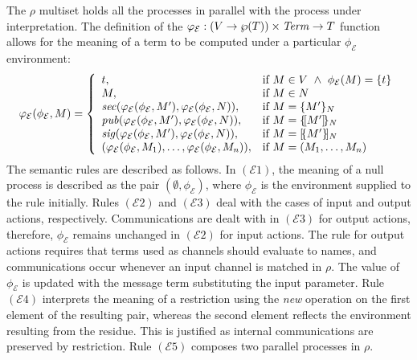 \documentclass{entcs} \usepackage{entcsmacro}
\begin{document}
The $\rho$ multiset holds all the processes in parallel with the process under interpretation.  The definition of the $\varphi_\mathcal{E}:( V\to\wp(T))\times\mbox{{\itshape Term\/}}\to T$ function allows for the meaning of a term to be computed under a particular $\phi_\mathcal{E}$ environment:
\[\varphi_\mathcal{E}(\phi_\mathcal{E},M)=\left\{\begin{array}{ll}t,&\mbox{if }M\in V~\wedge~\phi_\mathcal{E}(M)=\{t\}\\
M,&\mbox{if }M\in N\\
\mbox{{\itshape sec\/}}(\varphi_\mathcal{E}(\phi_\mathcal{E},M'),\varphi_\mathcal{E}(\phi_\mathcal{E},N)),&\mbox{if }M=\{M'\}_{N}\\
\mbox{{\itshape pub\/}}(\varphi_\mathcal{E}(\phi_\mathcal{E},M'),\varphi_\mathcal{E}(\phi_\mathcal{E},N)),&\mbox{if }M=\{\![M']\!\}_{N}\\
\mbox{{\itshape sig\/}}(\varphi_\mathcal{E}(\phi_\mathcal{E},M'),\varphi_\mathcal{E}(\phi_\mathcal{E},N)),&\mbox{if }M=[\!\{M'\}\!]_{N}\\
(\varphi_\mathcal{E}(\phi_\mathcal{E},M_1),\ldots,\varphi_\mathcal{E}(\phi_\mathcal{E},M_n)),&\mbox{if }M=(M_1,\ldots,M_n)\\
\end{array}\right.\]
The semantic rules are described as follows.  In $(\mathcal{E}1)$, the meaning of a null process is described as the pair $(\emptyset,\phi_\mathcal{E})$, where $\phi_\mathcal{E}$ is the environment supplied to the rule initially.  Rules $(\mathcal{E}2)$ and $(\mathcal{E}3)$ deal with the cases of input and output actions, respectively. Communications are dealt with in $(\mathcal{E}3)$ for output actions, therefore, $\phi_\mathcal{E}$ remains unchanged in $(\mathcal{E}2)$ for input actions.  The rule for output actions requires that terms used as channels should evaluate to names, and communications occur whenever an input channel is matched in $\rho$.  The value of $\phi_\mathcal{E}$ is updated with the message term substituting the input parameter.  Rule $(\mathcal{E}4)$ interprets the meaning of a restriction using the {\itshape new\/} operation on the first element of the resulting pair, whereas the second element reflects the environment resulting from the residue.  This is justified as internal communications are preserved by restriction. Rule $(\mathcal{E}5)$ composes two parallel processes in $\rho$.
\end{document}

